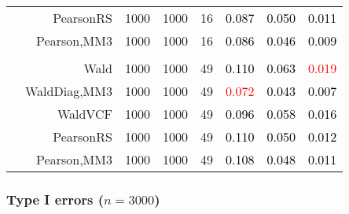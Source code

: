 \documentclass[
]{article}
\begin{document}
\begin{table}[H]
{\begin{tabular}[t]{lrrrrrrr}
\hspace{1em} & PearsonRS & 1000 & 1000 & 16 & \textcolor{black}{0.087} & \textcolor{black}{0.050} & \textcolor{black}{0.011}\\

\hspace{1em} & Pearson,MM3 & 1000 & 1000 & 16 & \textcolor{black}{0.086} & \textcolor{black}{0.046} & \textcolor{black}{0.009}\\
\cmidrule{1-8}
\addlinespace[0.3em]
\multicolumn{8}{l}{\textbf{3F 15V}}\\
\hspace{1em} & Wald & 1000 & 1000 & 49 & \textcolor{black}{0.110} & \textcolor{black}{0.063} & \textcolor{red}{0.019}\\

\hspace{1em} & WaldDiag,MM3 & 1000 & 1000 & 49 & \textcolor{red}{0.072} & \textcolor{black}{0.043} & \textcolor{black}{0.007}\\

\hspace{1em} & WaldVCF & 1000 & 1000 & 49 & \textcolor{black}{0.096} & \textcolor{black}{0.058} & \textcolor{black}{0.016}\\

\hspace{1em} & PearsonRS & 1000 & 1000 & 49 & \textcolor{black}{0.110} & \textcolor{black}{0.050} & \textcolor{black}{0.012}\\

\hspace{1em} & Pearson,MM3 & 1000 & 1000 & 49 & \textcolor{black}{0.108} & \textcolor{black}{0.048} & \textcolor{black}{0.011}\\
\bottomrule
\end{tabular}}
\endgroup{}
\end{table}

\hypertarget{type-i-errors-n3000}{%
\subsubsection{\texorpdfstring{Type I errors
(\(n=3000\))}{Type I errors (n=3000)}}\label{type-i-errors-n3000}}
\end{document}
